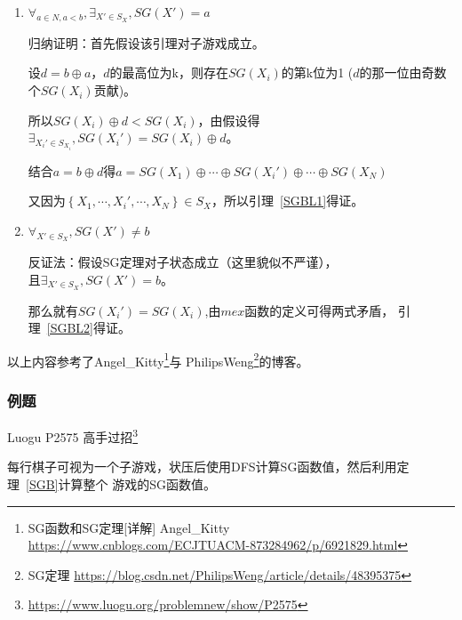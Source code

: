 \begin{enumerate}
	\item
	      \begin{lemma}\label{SGBL1}
		      $\forall_{a\in N,a<b},\exists_{X'\in S_X},SG(X')=a$
	      \end{lemma}

	      归纳证明：首先假设该引理对子游戏成立。

	      设$d=b\oplus a$，$d$的最高位为k，则存在$SG(X_i)$的第k位为1
	      ($d$的那一位由奇数个$SG(X_i)$贡献)。

	      所以$SG(X_i)\oplus d<SG(X_i)$，由假设得$\exists_{X_i'\in
			      S_{X_i}},SG(X_i')=SG(X_i)\oplus d$。

	      结合$a=b\oplus d$得$a=SG(X_1)\oplus \cdots \oplus SG(X_i')
		      \oplus \cdots \oplus SG(X_N)$

	      又因为$\left\{X_1,\cdots,X_i',\cdots,X_N\right\}\in S_X$，所以引理~\ref{SGBL1}得证。

	\item
	      \begin{lemma}\label{SGBL2}
		      $\forall_{X'\in S_X},SG(X')\neq b$
	      \end{lemma}

	      反证法：假设SG定理对子状态成立（这里貌似不严谨），\\且$\exists_{X' \in S_X},SG(X')=b$。

	      那么就有$SG(X_i')=SG(X_i)$,由$mex$函数的定义可得两式矛盾，
		  引理~\ref{SGBL2}得证。

\end{enumerate}

以上内容参考了Angel\_Kitty\footnote{SG函数和SG定理[详解] Angel\_Kitty
\url{https://www.cnblogs.com/ECJTUACM-873284962/p/6921829.html}}与
PhilipsWeng\footnote{SG定理
	\url{https://blog.csdn.net/PhilipsWeng/article/details/48395375}}的博客。

\subsubsection{例题}

Luogu P2575 高手过招\footnote{\url{https://www.luogu.org/problemnew/show/P2575}}

每行棋子可视为一个子游戏，状压后使用DFS计算SG函数值，然后利用定理~\ref{SGB}计算整个
游戏的SG函数值。



